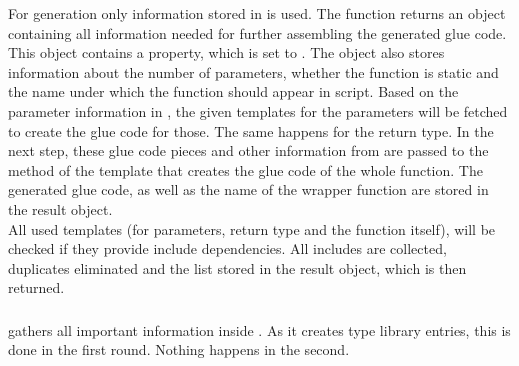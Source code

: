 For generation only information stored in  is used. The  function returns an object containing all information needed for further assembling the generated glue code. This object contains a  property, which is set to . The object also stores information about the number of parameters, whether the function is static and the name under which the function should appear in script. Based on the parameter information in , the given templates for the parameters will be fetched to create the glue code for those. The same happens for the return type. In the next step, these glue code pieces and other information from  are passed to the  method of the template that creates the glue code of the whole function. The generated glue code, as well as the name of the wrapper function are stored in the result object.\\
All used templates (for parameters, return type and the function itself), will be checked if they provide include dependencies. All includes are collected, duplicates eliminated and the list stored in the result object, which is then returned.

\subsubsection{}

 gathers all important information inside \linebreak{}. As it creates type library entries, this is done in the first round. Nothing happens in the second.

